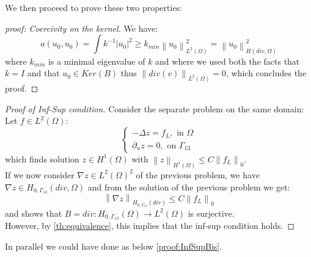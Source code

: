 \documentclass[conference]{IEEEtran}
\newcommand{\norm}[1]{\left\lVert#1\right\rVert}
\begin{document}
We then proceed to prove these two properties:
\begin{proof}[proof: Coercivity on the kernel]
We have: 
$$a(u_0,u_0)=\int k^{-1} |u_0|^2 \geq k_{min} \norm{u_0}^2_{L^2(\Omega)} = \norm{u_0}^2_{H(div,\Omega)}$$ 
where $k_{min}$ is a minimal eigenvalue of $k$ and where we used both the facts that $k=I$ and that $u_0 \in Ker(B)$ thus $\norm{div(v)}_{L^2(\Omega)}=0$, which concludes the proof.
\end{proof}

\begin{proof}[Proof of Inf-Sup condition]
Consider the separate problem on the same domain:\\
Let $f \in L^2(\Omega)$:
\begin{equation}
	\begin{cases}
		-\Delta z = f_L ,  \text{  in } \Omega \\
		\partial_n z = 0 , \text{  on } \Gamma_{13}
	\end{cases}
	\label{eq:laplacian}
\end{equation}
which finds solution $z \in H^1(\Omega)$ with $\norm{z}_{H^1(\Omega)} \leq C \norm{f_L}_0 $.\\
If we now consider $\nabla z \in L^2(\Omega)^2$ of the previous problem, we have $\nabla z \in H_{0,\Gamma_{13}}(div,\Omega)$ and from the solution of the previous problem we get:
\begin{equation}
	\norm{\nabla z}_{H_{0,\Gamma_{13}}(div)} \leq C \norm{f_L}_0
	\label{eq:laplacianContinuity}
\end{equation} 
and shows that $B=div: H_{0,\Gamma_{13}}(\Omega) \longrightarrow L^2(\Omega)$ is surjective. \\
However, by \ref{th:equivalence}, this implies that the inf-sup condition holds.
\end{proof}
In parallel we could have done as below \ref{proof:InfSupBis}.
\end{document}
